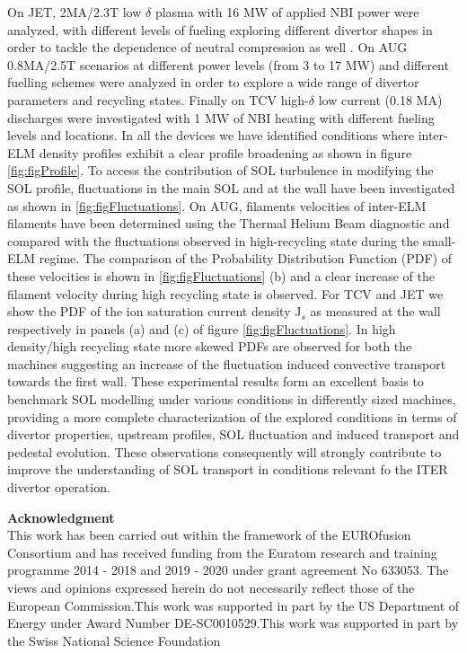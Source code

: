 \documentclass[12pt, a4paper, twoside]{article}
\begin{document}
On JET, 2MA/2.3T low $\delta$ plasma with 16 MW of
applied NBI power were analyzed, with different levels of fueling exploring different divertor shapes
in order to tackle the dependence of neutral compression as well
\cite{Tamain:2015cx}.
On AUG 0.8MA/2.5T scenarios at different power levels (from 3 to 17 MW) and different fuelling
schemes were analyzed in order to explore a wide range of divertor
parameters and recycling states.
Finally on TCV high-$\delta$ low current (0.18 MA)
discharges were investigated with 1 MW of NBI heating
with different fueling levels and locations. In all the devices we have identified conditions where inter-ELM density profiles exhibit a clear profile broadening as shown in
figure \ref{fig:figProfile}. To access the contribution of SOL
turbulence in modifying the SOL profile,
fluctuations in the main SOL and at the wall have been investigated
as shown in
\ref{fig:figFluctuations}. On AUG,  filaments velocities of
inter-ELM filaments have been determined using the Thermal Helium Beam
diagnostic and compared with the fluctuations
observed in high-recycling state during the small-ELM regime. The
comparison of the Probability Distribution Function (PDF) of these velocities is shown in
\ref{fig:figFluctuations} (b) and a clear increase of the filament velocity
during high recycling state is observed. For TCV and JET we show the
PDF of the ion saturation current
density J$_s$ as measured at the wall respectively in panels (a) and (c) of figure
\ref{fig:figFluctuations}.
In high density/high recycling state more skewed PDFs are
observed for both the machines suggesting an increase of the
fluctuation induced convective transport towards the first wall.
These experimental results form an excellent basis to benchmark SOL
modelling under various conditions in differently sized machines,
providing a more complete characterization of the
explored conditions in terms of divertor properties, upstream
profiles, SOL fluctuation and induced transport and pedestal evolution. These observations
consequently will strongly contribute to improve
the understanding of SOL transport in conditions relevant fo the ITER divertor operation.

\begingroup
{}
{\footnotesize\textbf{Acknowledgment}\\
This work has been carried out within the framework of the EUROfusion Consortium and has received funding from the Euratom research and training programme 2014 - 2018 and 2019 - 2020 under grant agreement No 633053. The views and opinions expressed herein do not necessarily reflect those of the European Commission.This work was supported in part by the US Department of Energy under Award Number DE-SC0010529.This work was supported in part by the Swiss National Science Foundation}
\begin{multicols}{2}
\setlength\bibitemsep{0pt}
\printbibliography[heading=none]
\end{multicols}
\endgroup
\end{document}
